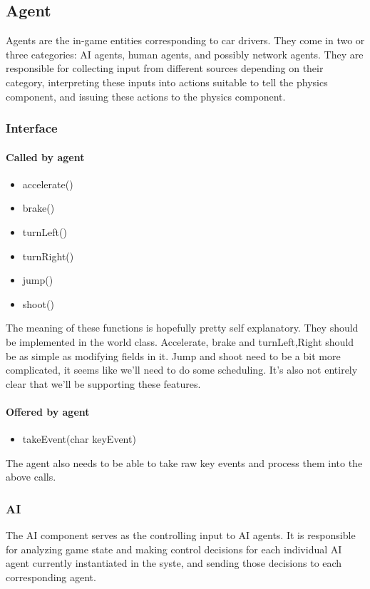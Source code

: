 \documentclass[12pt]{article}
\begin{document}
\subsection{Agent}
Agents are the in-game entities corresponding to car drivers. They come in
two or three categories: AI agents, human agents, and possibly network agents.
They are responsible for collecting input from different sources depending on
their category, interpreting these inputs into actions suitable to tell the
physics component, and issuing these actions to the physics component.

\subsubsection{Interface}

\paragraph{Called by agent}
\begin{itemize}
\item accelerate()
\item brake()
\item turnLeft()
\item turnRight()
\item jump()
\item shoot()
\end{itemize}
The meaning of these functions is hopefully pretty self explanatory. They should be implemented in the world class. Accelerate, brake and turn{Left,Right} should be as simple as modifying fields in it.
Jump and shoot need to be a bit more complicated, it seems like we'll need to do some scheduling. It's also not entirely clear that we'll be supporting these features.

\paragraph{Offered by agent}
\begin{itemize}
\item takeEvent(char keyEvent)
\end{itemize}
The agent also needs to be able to take raw key events and process them into the above calls.

\subsubsection{AI}
The AI component serves as the controlling input to AI agents. It is responsible
for analyzing game state and making control decisions for each individual AI
agent currently instantiated in the syste, and sending those decisions to
each corresponding agent.
\end{document}
